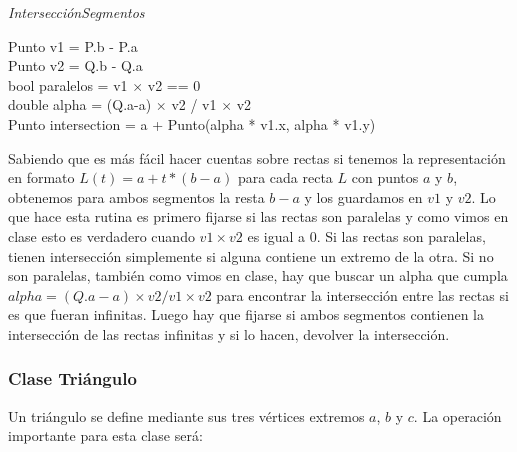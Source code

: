 \begin{algorithm}[H]
	\caption{\textit{IntersecciónSegmentos}}
	Punto v1 = P.b - P.a \\
	Punto v2 = Q.b - Q.a \\
	bool paralelos = v1 $\times$ v2 == 0 \\
	 {
		double alpha = (Q.a-a) $\times$ v2 / v1 $\times$ v2 \\
		Punto intersection = a + Punto(alpha * v1.x, alpha * v1.y)
	}{
		 {}
		 {}
		 {}
		 {}
	}
\end{algorithm}

Sabiendo que es más fácil hacer cuentas sobre rectas si tenemos la representación en formato $L(t)=a+t*(b-a)$ para
cada recta $L$ con puntos $a$ y $b$, obtenemos para ambos segmentos la resta $b-a$ y los guardamos en $v1$ y $v2$.
Lo que hace esta rutina es primero fijarse si las rectas son paralelas y como vimos en clase esto es verdadero
cuando $v1 \times v2$ es igual a 0. Si las rectas son paralelas, tienen intersección simplemente si alguna 
contiene un extremo de la otra. Si no son paralelas, también como vimos en clase, hay que buscar un alpha que
cumpla $alpha = (Q.a-a) \times v2 / v1 \times v2$ para encontrar la intersección entre las rectas si es que
fueran infinitas. Luego hay que fijarse si ambos segmentos contienen la intersección de las rectas infinitas
y si lo hacen, devolver la intersección.

\subsubsection*{Clase Triángulo}

Un triángulo se define mediante sus tres vértices extremos $a$, $b$ y $c$.
La operación importante para esta clase será:

